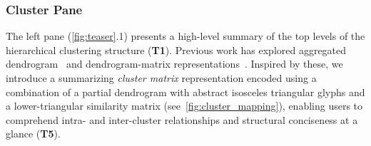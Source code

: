 \documentclass[preprint,journal]{vgtc}            %
\begin{document}
\subsubsection{Cluster Pane}
\label{subsubsec:cluster_pane}

The left pane (\cref{fig:teaser}.1) presents a high-level summary of the top levels of the hierarchical clustering structure (\textbf{T1}). 
Previous work has explored aggregated dendrogram~\cite{Liu20Aggregated} and dendrogram-matrix representations~\cite{Chen09Constructing}.
Inspired by these, we introduce a summarizing \textit{cluster matrix} representation encoded using a combination of a partial dendrogram with abstract isosceles triangular glyphs and a lower-triangular similarity matrix (see~\cref{fig:cluster_mapping}), enabling users to comprehend intra- and inter-cluster relationships and structural conciseness at a glance (\textbf{T5}).
\end{document}
